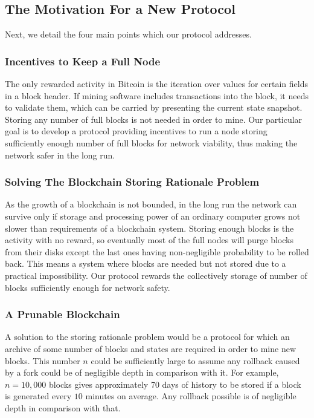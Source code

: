 \documentclass[conference,compsoc]{IEEEtran}
\begin{document}
\subsection{The Motivation For a New Protocol}
\label{section_motiv}

Next, we detail the four main points which our protocol addresses.

\subsubsection{Incentives to Keep a Full Node}

 The only rewarded activity in Bitcoin is the iteration over values for certain fields in a block header. If mining software includes transactions into the block, it needs to validate them, which can be carried by presenting the current state snapshot. Storing any number of full blocks is not needed in order to mine. Our particular goal is to develop a protocol providing incentives to run a node storing sufficiently enough number of full blocks for network viability, thus making the network safer in the long run. 

\subsubsection{Solving The Blockchain Storing Rationale Problem}

As the growth of a blockchain is not bounded, in the long run the network can survive only if storage and processing power of an ordinary computer grows not slower than requirements of a blockchain system. Storing enough blocks is the activity with no reward, so eventually most of the full nodes will purge blocks from their disks except the last ones having non-negligible probability to be rolled back. This means a system where blocks are needed but not stored due to a practical impossibility. Our protocol rewards the collectively storage of number of blocks sufficiently enough for network safety. 

\subsubsection{A Prunable Blockchain}

A solution to the storing rationale problem would be a protocol for which an archive of some number of blocks and states are required in order to mine new blocks. This number \(n\) could be sufficiently large to assume any rollback caused by a fork could be of negligible depth in comparison with it. For example, \(n = 10,000\) blocks gives approximately 70 days of history to be stored if a block is generated every \(10\) minutes on average. Any rollback possible is of negligible depth in comparison with that. 
\end{document}
